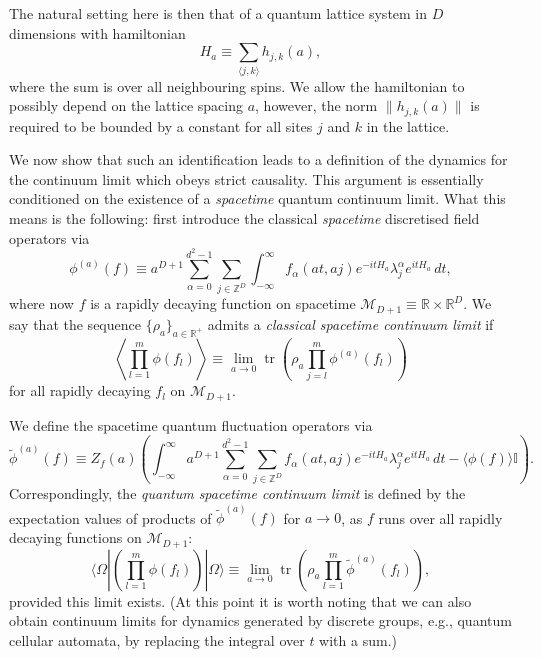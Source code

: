 \documentclass[prl,twocolumn,lengthcheck,superscriptaddress]{revtex4-1}
\newcommand{\tr}{\operatorname{tr}}
\theoremstyle{definition}
\theoremstyle{remark}
\begin{document}
The natural setting here is then that of a quantum lattice system in $D$ dimensions with hamiltonian 
\begin{equation}
	H_a \equiv \sum_{\langle j,k\rangle } h_{j,k}(a),
\end{equation}
where the sum is over all neighbouring spins. We allow the hamiltonian to possibly depend on the lattice spacing $a$, however, the norm $\|h_{j,k}(a)\|$ is required to be bounded by a constant for all sites $j$ and $k$ in the lattice. 

We now show that such an identification leads to a definition of the dynamics for the continuum limit which obeys strict causality. This argument is essentially conditioned on the existence of a \emph{spacetime} quantum continuum limit. What this means is the following: first introduce the classical \emph{spacetime} discretised field operators via
\begin{equation}
	\phi^{(a)}(f) \equiv a^{D+1}\sum_{\alpha = 0}^{d^2-1}\sum_{j\in\mathbb{Z}^D} \int_{-\infty}^\infty f_\alpha(at, aj) e^{-itH_a}\lambda^\alpha_je^{itH_a} \, dt,
\end{equation}
where now $f$ is a rapidly decaying function on spacetime $\mathcal{M}_{D+1}\equiv\mathbb{R}\times \mathbb{R}^D$. We say that the sequence 
$\{\rho_a\}_{a\in\mathbb{R}^+}$ admits a \emph{classical spacetime continuum limit} if 
\begin{equation}
	\left\langle\prod_{l=1}^m\phi(f_l)\right\rangle \equiv \lim_{a\rightarrow 0} \tr\left(\rho_a \prod_{j=l}^m\phi^{(a)}(f_l)\right)
\end{equation}
for all rapidly decaying $f_l$ on $\mathcal{M}_{D+1}$.

We define the spacetime quantum fluctuation operators via
\begin{equation}
	\widetilde{\phi}^{(a)}(f) \equiv Z_f(a)\left( \int_{-\infty}^\infty  a^{D+1}\sum_{\alpha = 0}^{d^2-1}\sum_{j\in \mathbb{Z}^D} f_\alpha(at, aj) e^{-itH_a}\lambda^\alpha_je^{itH_a} \,dt - \langle\phi(f)\rangle\mathbb{I}\right).
\end{equation}
Correspondingly, the \emph{quantum spacetime continuum limit} is defined by the expectation values of products of $\widetilde{\phi}^{(a)}(f)$ for $a\rightarrow 0$, as $f$ runs over all rapidly decaying functions on $\mathcal{M}_{D+1}$:
\begin{equation}\label{eq:qsctslimit}
	\langle\Omega|\left(\prod_{l=1}^m\widehat{\phi}(f_l)\right)|\Omega\rangle \equiv \lim_{a\rightarrow 0} \tr\left(\rho_a \prod_{l=1}^m\widetilde{\phi}^{(a)}(f_l)\right),
\end{equation}
provided this limit exists.
(At this point it is worth noting that we can also obtain continuum limits for dynamics generated by discrete groups, e.g., quantum cellular automata, by replacing the integral over $t$ with a sum.)
\end{document}
